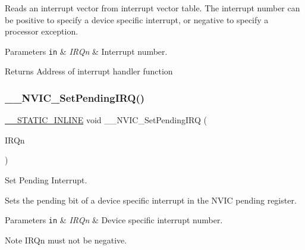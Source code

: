 Reads an interrupt vector from interrupt vector table. The interrupt number can be positive to specify a device specific interrupt, or negative to specify a processor exception. 
\begin{DoxyParams}[1]{Parameters}
\mbox{\tt in}  & {\em I\+R\+Qn} & Interrupt number. \\
\hline
\end{DoxyParams}
\begin{DoxyReturn}{Returns}
Address of interrupt handler function 
\end{DoxyReturn}
\mbox{\label{group___c_m_s_i_s___core___n_v_i_c_functions_gaabefdd4b790b9a7308929938c0c1e1ad}} 
\subsubsection{\texorpdfstring{\+\_\+\+\_\+\+N\+V\+I\+C\+\_\+\+Set\+Pending\+I\+R\+Q()}{\_\_NVIC\_SetPendingIRQ()}}
{\footnotesize\ttfamily \mbox{\hyperlink{cmsis__iccarm_8h_aba87361bfad2ae52cfe2f40c1a1dbf9c}{\+\_\+\+\_\+\+S\+T\+A\+T\+I\+C\+\_\+\+I\+N\+L\+I\+NE}} void \+\_\+\+\_\+\+N\+V\+I\+C\+\_\+\+Set\+Pending\+I\+RQ (\begin{DoxyParamCaption}\item[{\mbox{\hyperlink{group___interrupt__vector__numbers_gac3af4a32370fb28c4ade8bf2add80251}{I\+R\+Qn\+\_\+\+Type}}}]{I\+R\+Qn }\end{DoxyParamCaption})}



Set Pending Interrupt. 

Sets the pending bit of a device specific interrupt in the N\+V\+IC pending register. 
\begin{DoxyParams}[1]{Parameters}
\mbox{\tt in}  & {\em I\+R\+Qn} & Device specific interrupt number. \\
\hline
\end{DoxyParams}
\begin{DoxyNote}{Note}
I\+R\+Qn must not be negative. 
\end{DoxyNote}
\mbox{\label{group___c_m_s_i_s___core___n_v_i_c_functions_ga505338e23563a9c074910fb14e7d45fd}} 
